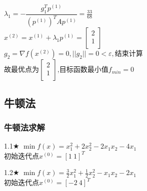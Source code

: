 \begin{solution}
    $\lambda_1=-\dfrac{g_1^Tp^{(1)}}{(p^{(1)})^TAp^{(1)}}=\frac{33}{68}$\\
    $x^{(2)}=x^{(1)}+\lambda_1p^{(1)}=\begin{bmatrix} 2\\1\\\end{bmatrix}$\\
    $g_2=\nabla f(x^{(2)})=0,||g_2||=0<\varepsilon,\text{结束计算}$\\
    故最优点为$\begin{bmatrix} 2\\1\\\end{bmatrix}$,目标函数最小值$f_{min}=0$
\end{solution}

\subsection{牛顿法}

\subsubsection{牛顿法求解}

\begin{problem}{1.1$\bigstar$}
    $\min f(x)=x_1^2+2x_2^2-2x_1x_2-4x_1$\\
    初始迭代点${x^{(0)}}=[1\ 1]^T$
\end{problem}

\begin{problem}{1.2$\bigstar$}
    $\min f(x)=\frac{3}{2}x_1^2+\frac{1}{2}x_2^2-x_1x_2-2x_1$\\
    初始迭代点${x^{(0)}}=[-2\ 4]^T$
\end{problem}